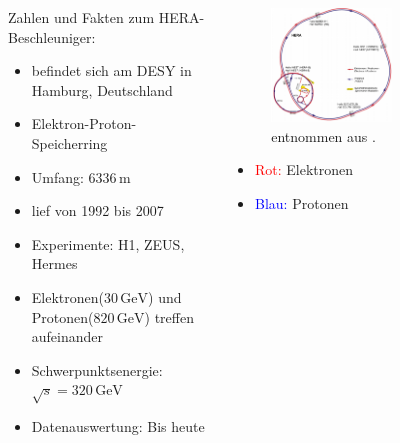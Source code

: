 \documentclass[aspectratio=1610, 9pt]{beamer}
\begin{document}
\begin{frame}
  \begin{columns}
    \begin{column}{0.4\textwidth}
      Zahlen und Fakten zum HERA-Beschleuniger:
      \begin{itemize}
        \item{befindet sich am DESY in Hamburg, Deutschland}
        \item{Elektron-Proton-Speicherring}
        \item{Umfang: $6336 \,\mathrm{m}$}
        \item{lief von 1992 bis 2007}
        \item{Experimente: H1, ZEUS, Hermes}
        \item{Elektronen($30 \,\mathrm{GeV}$) und Protonen($820 \,\mathrm{GeV}$) treffen aufeinander}
        \item{Schwerpunktsenergie: $\sqrt{s} = 320 \,\mathrm{GeV} $}
        \item{Datenauswertung: Bis heute}
      \end{itemize}
    \end{column}

    \begin{column}{0.6\textwidth}
      \begin{figure}
        \centering
        \includegraphics[width=0.6\textwidth]{images/hera.png}
        \caption{entnommen aus \cite{Libre}.}
      \end{figure}
      \centering
      \begin{itemize}
        \item{ \textcolor{red}{Rot:} Elektronen }
        \item{ \textcolor{blue}{Blau:} Protonen }
      \end{itemize}
    \end{column}
 \end{columns}
\end{frame}
\end{document}
